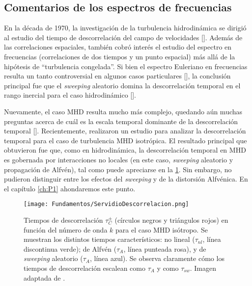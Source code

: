 


\subsection{Comentarios de los espectros de frecuencias}\label{sec2:SpectraFreq}

En la década de 1970, la investigación de la turbulencia hidrodinámica
se dirigió al estudio del tiempo de descorrelación del campo de
velocidades [\cite{tennekes_eulerian_1975, orszag_numerical_1972,
orszag_analytical_1970, comte-bellot_simple_1971}]. Además de las
correlaciones espaciales, también cobró interés el estudio del
espectro en frecuencias (correlaciones de dos tiempos y un punto
espacial) más allá de la hipótesis de ``turbulencia congelada''. Si
bien el espectro Euleriano en frecuencias resulta un tanto
controversial en algunos casos particulares [\cite{chen_sweeping_1989,
nelkin_time_1990}], la conclusión principal fue que el
\textit{sweeping} aleatorio domina la descorrelación temporal en el rango
inercial para el caso hidrodinámico
[\cite{zhou_non-gaussian_1993,sanada_random_1992}].

Nuevamente, el caso MHD resulta mucho más complejo, quedando aún
muchas preguntas acerca de cuál es la escala temporal dominante de la
descorrelación temporal [\cite{busse_2010_lagrangian}].
Recientemente, \cite{servidio_time_2011} realizaron un estudio para
analizar la descorrelación temporal para el caso de turbulencia MHD
isotrópica. El resultado principal que obtuvieron fue que, como en
hidrodinámica, la descorrelación temporal en MHD es gobernada por
interacciones no locales (en este caso, \emph{sweeping} aleatorio y
propagación de Alfv\'en), tal como puede apreciarse en
la \cref{fig2:ServidioDescorrelacion}. Sin embargo, no pudieron
distinguir entre los efectos del \emph{sweeping} y de la distorsión
Alfv\'enica. En el capítulo \ref{ch:P1} ahondaremos este punto.
\begin{figure}[h]
  \centering
  \texttt{[image: Fundamentos/ServidioDescorrelacion.png]}
  \caption{Tiempos de descorrelación $\tau_C^\pm$ (círculos negros y triángulos rojos) en función del número de onda $k$ para el caso MHD isótropo. Se muestran los distintos tiempos característicos: no lineal ($\tau_{nl}$, línea discontinua verde); de Alfv\'en ($\tau_{A}$, línea punteada rosa), y de \emph{sweeping} aleatorio ($\tau_{A}$, línea azul). Se observa claramente cómo los tiempos de descorrelación escalean como $\tau_{A}$ y como $\tau_{sw}$. Imagen adaptada de \cite{servidio_time_2011}.}
  \label{fig2:ServidioDescorrelacion}
\end{figure}





